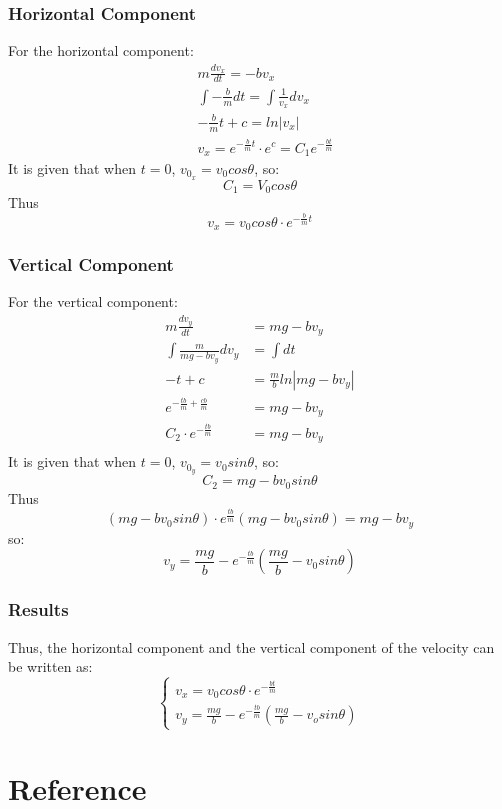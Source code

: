 \documentclass{article}
\begin{document}
        \subsubsection{Horizontal Component}
        For the horizontal component:
        \begin{equation}
            \begin{aligned}
                &m\frac{dv_x}{dt}= -bv_x\\
                &\int-\frac{b}{m}dt = \int\frac{1}{v_x}dv_x\\
                &-\frac{b}{m}t+c = ln |v_x|\\
                &v_x = e^{-\frac{b}{m}t}\cdot e^c = C_1e^{-\frac{bt}{m}}
            \end{aligned}
        \end{equation}
        It is given that when $t = 0$, $v_{0_x} = v_0cos\theta$, so:
        $$C_1 = V_0cos\theta$$
        Thus
        \begin{equation} \label{x_air}
            v_x = v_0cos\theta \cdot e^{-\frac{b}{m}t}
        \end{equation}
        \subsubsection{Vertical Component}
        For the vertical component:
        \begin{equation}
            \begin{aligned}
                m\frac{dv_y}{dt} &= mg-bv_y\\
                \int \frac{m}{mg-bv_y}dv_y &= \int dt\\
                -t + c &= \frac{m}{b}ln|mg-bv_y| \\
                e^{-\frac{tb}{m} + \frac{cb}{m}} &= mg-bv_y\\
                C_2\cdot e^{-\frac{tb}{m}} &= mg-bv_y\\
            \end{aligned}
        \end{equation}
        It is given that when $t = 0$, $v_{0_y} = v_0sin\theta$, so:
        $$C_2 = mg-bv_0sin\theta$$
        Thus
        $$(mg-bv_0sin\theta)\cdot e^{\frac{tb}{m}}(mg-bv_0sin\theta) = mg-bv_y$$
        so:
        \begin{equation} \label{y_air}
            v_y = \frac{mg}{b}-e^{-\frac{tb}{m}}(\frac{mg}{b}-v_0sin\theta)
        \end{equation}
        \subsubsection{Results}
        Thus, the horizontal component and the vertical component of the velocity can be written as:
        \begin{equation*}
            \begin{cases}
            v_x = v_0cos\theta\cdot e^{-\frac{bt}{m}}\\
            v_y = \frac{mg}{b} - e^{-\frac{tb}{m}}(\frac{mg}{b}-v_osin\theta)
            \end{cases}
        \end{equation*}
        
        
\section{Reference}
\printbibliography
\end{document}
